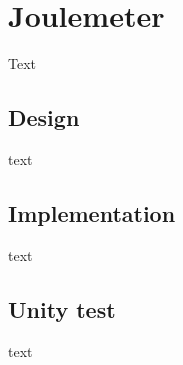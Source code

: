 \section{Joulemeter}
Text

\subsection{Design}
text

\subsection{Implementation}
text

\subsection{Unity test}
text